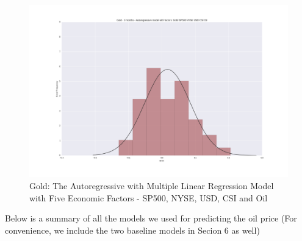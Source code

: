 \documentclass[runningheads]{llncs}
\begin{document}
\begin{figure}
\centering
\includegraphics[width=\textwidth]{Gold_SP500_NYSE_USD_CSI_Oil.png}
\caption{Gold: The Autoregressive with Multiple Linear Regression Model with Five Economic Factors - SP500, NYSE, USD, CSI and Oil}
\label{fig:Gold_SP500_NYSE_USD_CSI_Oil.png}
\end{figure}

\noindent Below is a summary of all the models we used for predicting the oil price (For convenience, we include the two baseline models in Secion 6 as well) \\
\end{document}
